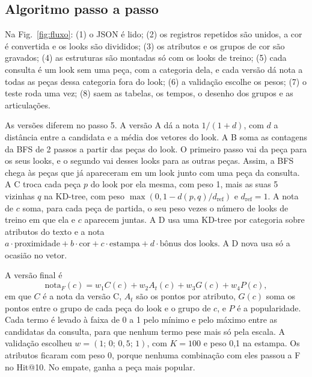\subsection{Algoritmo passo a passo}

Na Fig.~\ref{fig:fluxo}: (1) o JSON é lido; (2) os registros repetidos são unidos, a cor é convertida e os looks são divididos; (3) os atributos e os grupos de cor são gravados; (4) as estruturas são montadas só com os looks de treino; (5) cada consulta é um look sem uma peça, com a categoria dela, e cada versão dá nota a todas as peças dessa categoria fora do look; (6) a validação escolhe os pesos; (7) o teste roda uma vez; (8) saem as tabelas, os tempos, o desenho dos grupos e as articulações.

As versões diferem no passo 5. A versão A dá a nota $1/(1 + d)$, com $d$ a distância entre a candidata e a média dos vetores do look. A B soma as contagens da BFS de 2 passos a partir das peças do look. O primeiro passo vai da peça para os seus looks, e o segundo vai desses looks para as outras peças. Assim, a BFS chega às peças que já apareceram em um look junto com uma peça da consulta. A C troca cada peça $p$ do look por ela mesma, com peso 1, mais as suas 5 vizinhas $q$ na KD-tree, com peso $\max(0, 1 - d(p,q)/d_{\text{ref}})$ e $d_{\text{ref}} = 1$. A nota de $c$ soma, para cada peça de partida, o seu peso vezes o número de looks de treino em que ela e $c$ aparecem juntas. A D usa uma KD-tree por categoria sobre atributos do texto e a nota $a \cdot \text{proximidade} + b \cdot \text{cor} + c \cdot \text{estampa} + d \cdot \text{bônus dos looks}$. A D nova usa só a ocasião no vetor.

A versão final é
\begin{equation}
\text{nota}_F(c) = w_1 C(c) + w_2 A_t(c) + w_3 G(c) + w_4 P(c),
\end{equation}
em que $C$ é a nota da versão C, $A_t$ são os pontos por atributo, $G(c)$ soma os pontos entre o grupo de cada peça do look e o grupo de $c$, e $P$ é a popularidade. Cada termo é levado à faixa de 0 a 1 pelo mínimo e pelo máximo entre as candidatas da consulta, para que nenhum termo pese mais só pela escala. A validação escolheu $w = (1;\, 0;\, 0{,}5;\, 1)$, com $K = 100$ e peso 0,1 na estampa. Os atributos ficaram com peso 0, porque nenhuma combinação com eles passou a F no Hit@10. No empate, ganha a peça mais popular.
